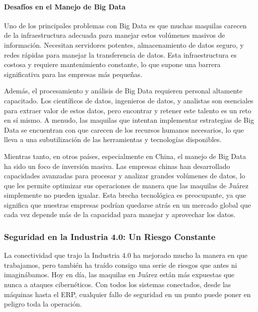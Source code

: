 \documentclass[
  10pt,
  letterpaper,
]{book}
\let\oldparagraph\paragraph
\renewcommand{\paragraph}[1]{\oldparagraph{#1}\mbox{}}
\begin{document}
\paragraph{Desafíos en el Manejo de Big
Data}\label{desafuxedos-en-el-manejo-de-big-data}

Uno de los principales problemas con Big Data es que muchas maquilas
carecen de la infraestructura adecuada para manejar estos volúmenes
masivos de información. Necesitan servidores potentes, almacenamiento de
datos seguro, y redes rápidas para manejar la transferencia de datos.
Esta infraestructura es costosa y requiere mantenimiento constante, lo
que supone una barrera significativa para las empresas más pequeñas.

Además, el procesamiento y análisis de Big Data requieren personal
altamente capacitado. Los científicos de datos, ingenieros de datos, y
analistas son esenciales para extraer valor de estos datos, pero
encontrar y retener este talento es un reto en sí mismo. A menudo, las
maquilas que intentan implementar estrategias de Big Data se encuentran
con que carecen de los recursos humanos necesarios, lo que lleva a una
subutilización de las herramientas y tecnologías disponibles.

Mientras tanto, en otros países, especialmente en China, el manejo de
Big Data ha sido un foco de inversión masiva. Las empresas chinas han
desarrollado capacidades avanzadas para procesar y analizar grandes
volúmenes de datos, lo que les permite optimizar sus operaciones de
manera que las maquilas de Juárez simplemente no pueden igualar. Esta
brecha tecnológica es preocupante, ya que significa que nuestras
empresas podrían quedarse atrás en un mercado global que cada vez
depende más de la capacidad para manejar y aprovechar los datos.

\subsubsection{Seguridad en la Industria 4.0: Un Riesgo
Constante}\label{seguridad-en-la-industria-4.0-un-riesgo-constante}

La conectividad que trajo la Industria 4.0 ha mejorado mucho la manera
en que trabajamos, pero también ha traído consigo una serie de riesgos
que antes ni imaginábamos. Hoy en día, las maquilas en Juárez están más
expuestas que nunca a ataques cibernéticos. Con todos los sistemas
conectados, desde las máquinas hasta el ERP, cualquier fallo de
seguridad en un punto puede poner en peligro toda la operación.
\end{document}
